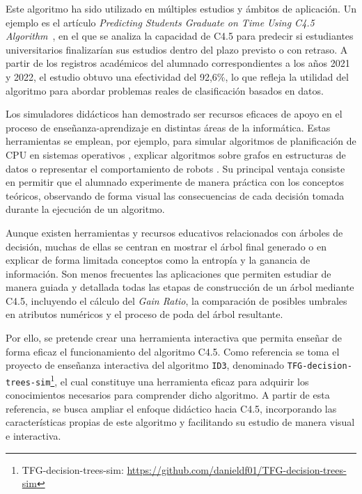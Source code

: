 Este algoritmo ha sido utilizado en múltiples estudios y ámbitos de aplicación. Un ejemplo es el artículo \textit{Predicting Students Graduate on Time Using C4.5 Algorithm}~\cite{artIntC4.5}, en el que se analiza la capacidad de C4.5 para predecir si estudiantes universitarios finalizarían sus estudios dentro del plazo previsto o con retraso. A partir de los registros académicos del alumnado correspondientes a los años 2021 y 2022, el estudio obtuvo una efectividad del 92,6\%, lo que refleja la utilidad del algoritmo para abordar problemas reales de clasificación basados en datos.

Los simuladores didácticos han demostrado ser recursos eficaces de apoyo en el proceso de enseñanza-aprendizaje en distintas áreas de la informática. Estas herramientas se emplean, por ejemplo, para simular algoritmos de planificación de CPU en sistemas operativos \cite{gonzalezRodriguez2024CPUScheduling}, explicar algoritmos sobre grafos en estructuras de datos \cite{antolinSendino2003Sigraf} o representar el comportamiento de robots \cite{gonzalezGarcia2023SimuladorRobotsArduino}. Su principal ventaja consiste en permitir que el alumnado experimente de manera práctica con los conceptos teóricos, observando de forma visual las consecuencias de cada decisión tomada durante la ejecución de un algoritmo.

Aunque existen herramientas y recursos educativos relacionados con árboles de decisión, muchas de ellas se centran en mostrar el árbol final generado o en explicar de forma limitada conceptos como la entropía y la ganancia de información. Son menos frecuentes las aplicaciones que permiten estudiar de manera guiada y detallada todas las etapas de construcción de un árbol mediante C4.5, incluyendo el cálculo del \textit{Gain Ratio}, la comparación de posibles umbrales en atributos numéricos y el proceso de poda del árbol resultante.

Por ello, se pretende crear una herramienta interactiva que permita enseñar de forma eficaz el funcionamiento del algoritmo C4.5. Como referencia se toma el proyecto de enseñanza interactiva del algoritmo \texttt{ID3}, denominado \texttt{TFG-decision-trees-sim}\footnote{TFG-decision-trees-sim: \url{https://github.com/danieldf01/TFG-decision-trees-sim}}, el cual constituye una herramienta eficaz para adquirir los conocimientos necesarios para comprender dicho algoritmo. A partir de esta referencia, se busca ampliar el enfoque didáctico hacia C4.5, incorporando las características propias de este algoritmo y facilitando su estudio de manera visual e interactiva.

